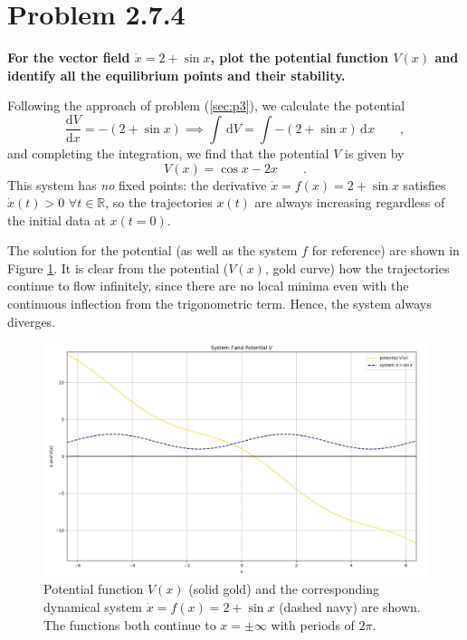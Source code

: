 \documentclass[draft]{agujournal2019}
\begin{document}
\section{Problem 2.7.4}
\label{sec:p4}



\textbf{For the vector field $\dot x = 2+\sin{x}$, plot the potential function $V(x)$ and identify all the equilibrium points and their stability.}
\par
Following the approach of problem (\ref{sec:p3}), we calculate the potential 
\begin{equation*}
    \frac{\mathrm{d}V}{\mathrm{d}x} = -(2+\sin{x}) \implies \int \,\mathrm{d}V = \int -(2+\sin{x})\mathrm\,{\mathrm{d}}x \qquad ,
\end{equation*}
and completing the integration, we find that the potential $V$ is given by
\begin{equation*}
    V(x) = \cos{x} - 2 x \qquad .
\end{equation*}
This system has \emph{no} fixed points: the derivative $\dot x = f(x)=2+\sin{x}$ satisfies $\dot x(t) > 0 \,\,\forall t\in\mathbb{R}$, so the trajectories $x(t)$ are always increasing regardless of the initial data at $x(t=0)$.
\par
The solution for the potential (as well as the system $f$ for reference) are shown in Figure \ref{fig:p4_potential}. It is clear from the potential ($V(x)$, gold curve) how the trajectories continue to flow infinitely, since there are no local minima even with the continuous inflection from the trigonometric term. Hence, the system always diverges.
\begin{figure}
    \hspace*{-0.7cm}
    \includegraphics[width=1.1\linewidth]{figs/p4.png}
    \caption{Potential function $V(x)$ (solid gold) and the corresponding dynamical system $\dot x = f(x) = 2+\sin{x}$ (dashed navy) are shown. The functions both continue to $x=\pm\infty$ with periods of $2\pi$. }
    \label{fig:p4_potential}
\end{figure}
\end{document}
